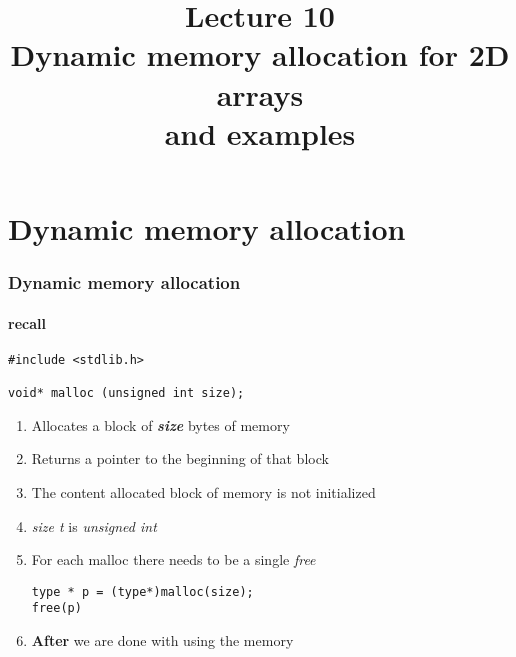 \documentclass[10pt]{beamer}
\title{Lecture 10\\Dynamic memory allocation for 2D arrays\\{\tiny and examples}}
\date{}
\begin{document}
\frame{
    \titlepage
}

\section{Dynamic memory allocation}

\begin{frame}[fragile]
  \frametitle{Dynamic memory allocation}
  \framesubtitle{recall}  
\centering

\begin{lstlisting}
#include <stdlib.h>

void* malloc (unsigned int size);
\end{lstlisting}

\begin{enumerate}
	\item Allocates a block of \textbf{\textit{size}} bytes of memory
	\item Returns a pointer to the beginning of that block
	\item The content allocated block of memory is not initialized
	\item \textit{size t} is \textit{unsigned int}
	\item For each malloc there needs to be a single \textit{free}
\begin{lstlisting}
type * p = (type*)malloc(size);
free(p)
\end{lstlisting}
	\item \textbf{After} we are done with using the memory
\end{enumerate}
\end{frame}
\end{document}

